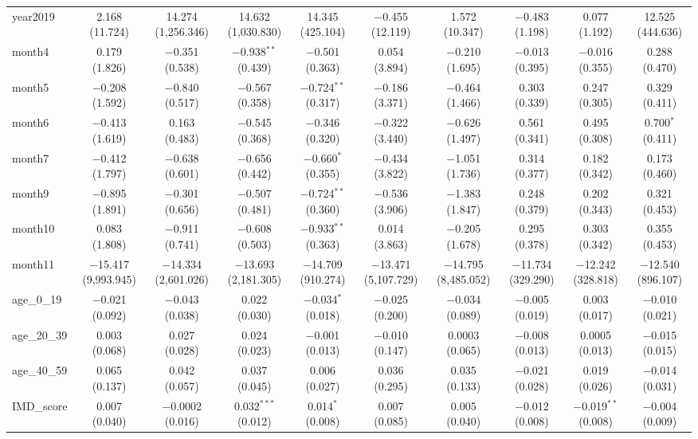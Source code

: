 \begin{table}[!htbp]
\begin{tabular}{@{\extracolsep{1pt}}lccccccccc}
  year2019 & 2.168 (11.724) & 14.274 (1,256.346) & 14.632 (1,030.830) & 14.345 (425.104) & $-$0.455 (12.119) & 1.572 (10.347) & $-$0.483 (1.198) & 0.077 (1.192) & 12.525 (444.636) \\ 
  month4 & 0.179 (1.826) & $-$0.351 (0.538) & $-$0.938$^{**}$ (0.439) & $-$0.501 (0.363) & 0.054 (3.894) & $-$0.210 (1.695) & $-$0.013 (0.395) & $-$0.016 (0.355) & 0.288 (0.470) \\ 
  month5 & $-$0.208 (1.592) & $-$0.840 (0.517) & $-$0.567 (0.358) & $-$0.724$^{**}$ (0.317) & $-$0.186 (3.371) & $-$0.464 (1.466) & 0.303 (0.339) & 0.247 (0.305) & 0.329 (0.411) \\ 
  month6 & $-$0.413 (1.619) & 0.163 (0.483) & $-$0.545 (0.368) & $-$0.346 (0.320) & $-$0.322 (3.440) & $-$0.626 (1.497) & 0.561 (0.341) & 0.495 (0.308) & 0.700$^{*}$ (0.411) \\ 
  month7 & $-$0.412 (1.797) & $-$0.638 (0.601) & $-$0.656 (0.442) & $-$0.660$^{*}$ (0.355) & $-$0.434 (3.822) & $-$1.051 (1.736) & 0.314 (0.377) & 0.182 (0.342) & 0.173 (0.460) \\ 
  month9 & $-$0.895 (1.891) & $-$0.301 (0.656) & $-$0.507 (0.481) & $-$0.724$^{**}$ (0.360) & $-$0.536 (3.906) & $-$1.383 (1.847) & 0.248 (0.379) & 0.202 (0.343) & 0.321 (0.453) \\ 
  month10 & 0.083 (1.808) & $-$0.911 (0.741) & $-$0.608 (0.503) & $-$0.933$^{**}$ (0.363) & 0.014 (3.863) & $-$0.205 (1.678) & 0.295 (0.378) & 0.303 (0.342) & 0.355 (0.453) \\ 
  month11 & $-$15.417 (9,993.945) & $-$14.334 (2,601.026) & $-$13.693 (2,181.305) & $-$14.709 (910.274) & $-$13.471 (5,107.729) & $-$14.795 (8,485.052) & $-$11.734 (329.290) & $-$12.242 (328.818) & $-$12.540 (896.107) \\ 
  age\_0\_19 & $-$0.021 (0.092) & $-$0.043 (0.038) & 0.022 (0.030) & $-$0.034$^{*}$ (0.018) & $-$0.025 (0.200) & $-$0.034 (0.089) & $-$0.005 (0.019) & 0.003 (0.017) & $-$0.010 (0.021) \\ 
  age\_20\_39 & 0.003 (0.068) & 0.027 (0.028) & 0.024 (0.023) & $-$0.001 (0.013) & $-$0.010 (0.147) & 0.0003 (0.065) & $-$0.008 (0.013) & 0.0005 (0.013) & $-$0.015 (0.015) \\ 
  age\_40\_59 & 0.065 (0.137) & 0.042 (0.057) & 0.037 (0.045) & 0.006 (0.027) & 0.036 (0.295) & 0.035 (0.133) & $-$0.021 (0.028) & 0.019 (0.026) & $-$0.014 (0.031) \\ 
  IMD\_score & 0.007 (0.040) & $-$0.0002 (0.016) & 0.032$^{***}$ (0.012) & 0.014$^{*}$ (0.008) & 0.007 (0.085) & 0.005 (0.040) & $-$0.012 (0.008) & $-$0.019$^{**}$ (0.008) & $-$0.004 (0.009) \\ 

\end{tabular}
\end{table}
